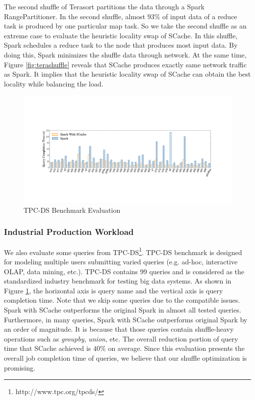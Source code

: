 The second shuffle of Terasort partitions the data through a Spark RangePartitioner. 
In the second shuffle, almost $93\%$ of input data of a reduce task is produced by one particular map task. 
So we take the second shuffle as an extreme case to evaluate the heuristic locality swap of SCache.
In this shuffle, Spark schedules a reduce task to the node that produces most input data. 
By doing this, Spark minimizes the shuffle data through network. 
At the same time, Figure \ref{fig:terashuffle} reveals that SCache produces exactly same network traffic as Spark. 
It implies that the heuristic locality swap of SCache can obtain the best locality while balancing the load. 
\begin{figure}
	\centering
	\includegraphics[width=.9\textwidth]{fig/tpcds}
	\caption{TPC-DS Benchmark Evaluation}
	\label{fig:tpcds}
	\vspace{-1em}
\end{figure}

\subsubsection{Industrial Production Workload}
We also evaluate some queries from TPC-DS\footnote{http://www.tpc.org/tpcds/}. 
TPC-DS benchmark is designed for modeling multiple users submitting varied queries (e.g. ad-hoc, interactive OLAP, data mining, etc.). 
TPC-DS contains 99 queries and is considered as the standardized industry benchmark for testing big data systems. 
As shown in Figure \ref{fig:tpcds}, the horizontal axis is query name and the vertical axis is query completion time. 
Note that we skip some queries due to the compatible issues. 
Spark with SCache outperforms the original Spark in almost all tested queries. 
Furthermore, in many queries, Spark with SCache outperforms original Spark by an order of magnitude. 
It is because that those queries contain shuffle-heavy operations such as \textit{groupby}, \textit{union}, etc.
The overall reduction portion of query time that SCache achieved is $40\%$ on average. 
Since this evaluation presents the overall job completion time of queries, we believe that our shuffle optimization is promising.

